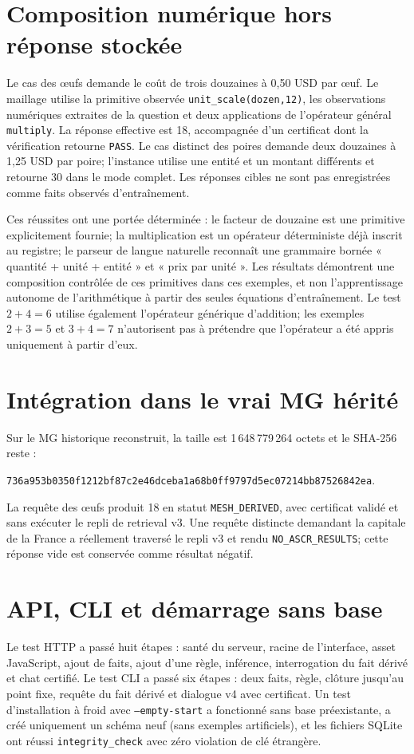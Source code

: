 \documentclass[11pt,a4paper]{book}
\begin{document}
\section{Composition numérique hors réponse stockée}
Le cas des œufs demande le coût de trois douzaines à 0,50 USD par œuf. Le maillage utilise la primitive observée \texttt{unit\_scale(dozen,12)}, les observations numériques extraites de la question et deux applications de l'opérateur général \texttt{multiply}. La réponse effective est 18, accompagnée d'un certificat dont la vérification retourne \texttt{PASS}. Le cas distinct des poires demande deux douzaines à 1,25 USD par poire; l'instance utilise une entité et un montant différents et retourne 30 dans le mode complet. Les réponses cibles ne sont pas enregistrées comme faits observés d'entraînement.

Ces réussites ont une portée déterminée : le facteur de douzaine est une primitive explicitement fournie; la multiplication est un opérateur déterministe déjà inscrit au registre; le parseur de langue naturelle reconnaît une grammaire bornée « quantité + unité + entité » et « prix par unité ». Les résultats démontrent une composition contrôlée de ces primitives dans ces exemples, et non l'apprentissage autonome de l'arithmétique à partir des seules équations d'entraînement. Le test $2+4=6$ utilise également l'opérateur générique d'addition; les exemples $2+3=5$ et $3+4=7$ n'autorisent pas à prétendre que l'opérateur a été appris uniquement à partir d'eux.

\section{Intégration dans le vrai MG hérité}
Sur le MG historique reconstruit, la taille est 1\,648\,779\,264 octets et le SHA-256 reste :\par\noindent\texttt{736a953b0350f1212bf87c2e46dceba1a68b0ff9797d5ec07214bb87526842ea}.\par La requête des œufs produit 18 en statut \texttt{MESH\_DERIVED}, avec certificat validé et sans exécuter le repli de retrieval v3. Une requête distincte demandant la capitale de la France a réellement traversé le repli v3 et rendu \texttt{NO\_ASCR\_RESULTS}; cette réponse vide est conservée comme résultat négatif.

\section{API, CLI et démarrage sans base}
Le test HTTP a passé huit étapes : santé du serveur, racine de l'interface, asset JavaScript, ajout de faits, ajout d'une règle, inférence, interrogation du fait dérivé et chat certifié. Le test CLI a passé six étapes : deux faits, règle, clôture jusqu'au point fixe, requête du fait dérivé et dialogue v4 avec certificat. Un test d'installation à froid avec \texttt{--empty-start} a fonctionné sans base préexistante, a créé uniquement un schéma neuf (sans exemples artificiels), et les fichiers SQLite ont réussi \texttt{integrity\_check} avec zéro violation de clé étrangère.
\end{document}
